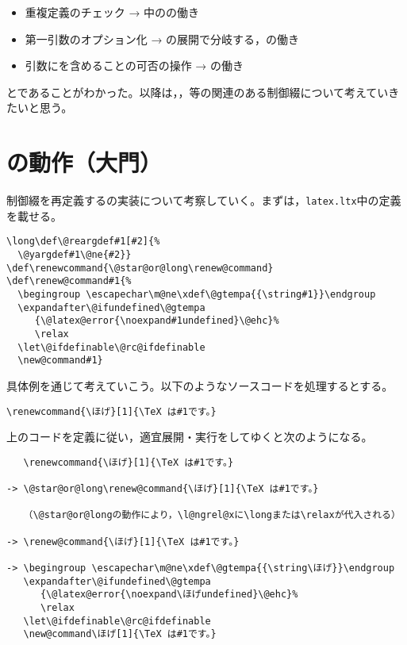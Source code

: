 \documentclass[autodetect-engine,dvipdfmx]{jsarticle}
\begin{document}
\begin{itemize}
\item 重複定義のチェック → 中のの働き
\item 第一引数のオプション化 → の展開で分岐する，の働き
\item 引数にを含めることの可否の操作 → の働き
\end{itemize}
とであることがわかった。以降は，，等の関連のある制御綴について考えていきたいと思う。

\section{の動作（大門）}

制御綴を再定義するの実装について考察していく。まずは，\texttt{latex.ltx}中の定義を載せる。
\latexltx
\begin{lstlisting}[firstnumber=639]
\long\def\@reargdef#1[#2]{%
  \@yargdef#1\@ne{#2}}
\def\renewcommand{\@star@or@long\renew@command}
\def\renew@command#1{%
  \begingroup \escapechar\m@ne\xdef\@gtempa{{\string#1}}\endgroup
  \expandafter\@ifundefined\@gtempa
     {\@latex@error{\noexpand#1undefined}\@ehc}%
     \relax
  \let\@ifdefinable\@rc@ifdefinable
  \new@command#1}
\end{lstlisting}

具体例を通じて考えていこう。以下のようなソースコードを処理するとする。
\texsource
\begin{lstlisting}
\renewcommand{\ほげ}[1]{\TeX は#1です。}
\end{lstlisting}

上のコードを定義に従い，適宜展開・実行をしてゆくと次のようになる。

\begin{lstlisting}
   \renewcommand{\ほげ}[1]{\TeX は#1です。}

-> \@star@or@long\renew@command{\ほげ}[1]{\TeX は#1です。}

   （\@star@or@longの動作により，\l@ngrel@xに\longまたは\relaxが代入される）

-> \renew@command{\ほげ}[1]{\TeX は#1です。}

-> \begingroup \escapechar\m@ne\xdef\@gtempa{{\string\ほげ}}\endgroup
   \expandafter\@ifundefined\@gtempa
      {\@latex@error{\noexpand\ほげundefined}\@ehc}%
      \relax
   \let\@ifdefinable\@rc@ifdefinable
   \new@command\ほげ[1]{\TeX は#1です。}
\end{lstlisting}
\end{document}
